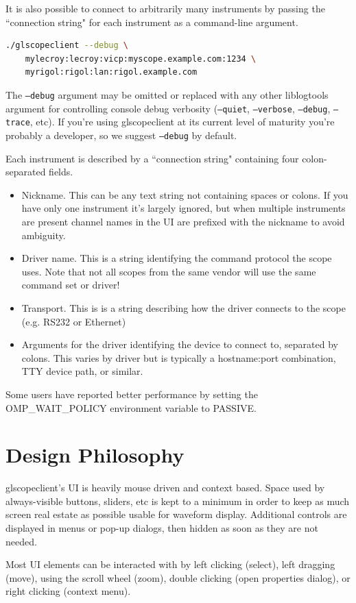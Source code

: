 It is also possible to connect to arbitrarily many instruments by passing the ``connection string" for each instrument
as a command-line argument.

\begin{lstlisting}[language=sh]
./glscopeclient --debug \
	mylecroy:lecroy:vicp:myscope.example.com:1234 \
	myrigol:rigol:lan:rigol.example.com
\end{lstlisting}

The \texttt{--debug} argument may be omitted or replaced with any other liblogtools argument for controlling console
debug verbosity (\texttt{--quiet}, \texttt{--verbose}, \texttt{--debug}, \texttt{--trace}, etc). If you're using
glscopeclient at its current level of maturity you're probably a developer, so we suggest \texttt{--debug} by default.

Each instrument is described by a ``connection string" containing four colon-separated fields.

\begin{itemize}
\item Nickname. This can be any text string not containing spaces or colons. If you have only one instrument it's
largely ignored, but when multiple instruments are present channel names in the UI are prefixed with the nickname to
avoid ambiguity.
\item Driver name. This is a string identifying the command protocol the scope uses. Note that not all
scopes from the same vendor will use the same command set or driver!
\item Transport. This is is a string describing how the driver connects to the scope (e.g. RS232 or Ethernet)
\item Arguments for the driver identifying the device to connect to, separated by colons. This varies by driver but is
typically a hostname:port combination, TTY device path, or similar.
\end{itemize}

Some users have reported better performance by setting the OMP\_WAIT\_POLICY environment variable to PASSIVE.

\section{Design Philosophy}

glscopeclient's UI is heavily mouse driven and context based. Space used by always-visible buttons, sliders, etc is
kept to a minimum in order to keep as much screen real estate as possible usable for waveform display. Additional
controls are displayed in menus or pop-up dialogs, then hidden as soon as they are not needed.

Most UI elements can be interacted with by left clicking (select), left dragging (move), using the scroll wheel (zoom),
double clicking (open properties dialog), or right clicking (context menu).
